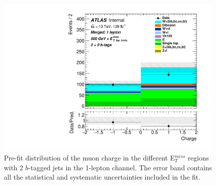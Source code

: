 \begin{figure}[!htb]
  \includegraphics[width=0.46\linewidth]{chapters/c9/figures/Region_BMin500_incFat1_Fat1_incJet1_Y2015_DCR1_T20_L1_distCharge_J0_Prefit.pdf}
\caption{Pre-fit distribution of the muon charge in the different E$_{T}^{miss}$ regions with 2 $b$-tagged jets in the 1-lepton channel.  The error band contains all the statistical and systematic uncertainties included in the fit.}
\label{fig:Data_MC_CR1_mu_charge_2b}
\end{figure}
